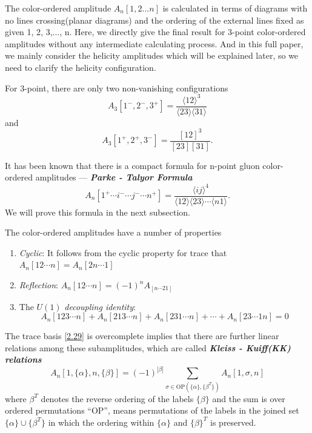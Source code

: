 \documentclass[12pt]{article}
\numberwithin{equation}{section}
\newcommand{\mdavg}[2]{\langle #1 \rangle\!\langle #2 \rangle}
\newcommand{\avg}[1]{\langle #1 \rangle}
\begin{document}
The color-ordered amplitude $A_n[1,2 ... n]$ is calculated in terms of diagrams with no lines crossing(planar diagrams) and the ordering of the external lines fixed as given 1, 2, 3,..., n. Here, we directly give the final result for 3-point color-ordered amplitudes without any intermediate calculating process. And in this full paper, we mainly consider the helicity amplitudes which will be explained later, so we need to clarify the helicity configuration.

For 3-point, there are only two non-vanishing configurations
\begin{equation}
    A_3[1^-,2^-,3^+]=\frac{\avg{12}^3}{\mdavg{23}{31}}
\end{equation}
and 
\begin{equation}
    A_3[1^+,2^+,3^-]=\frac{[12]^3}{[23][31]}.
\end{equation}

It has been known that there is a compact formula for n-point gluon color-ordered amplitudes --- \textbf{\textit{Parke - Talyor Formula}}
\begin{equation}
    A_n[1^+\cdots i^-\cdots j^- \cdots n^+]=\frac{\avg{ij}^4}{\mdavg{12}{23}\cdots\avg{n1}}.
\end{equation}
We will prove this formula in the next subsection.

The color-ordered amplitudes have a number of properties
\begin{enumerate}
    \item \textit{Cyclic}: It follows from the cyclic property for trace that $A_n[12\cdots n]=A_n[2n\cdots 1]$
    \item \textit{Reflection}: $A_n[12\cdots n]=(-1)^nA_[n\cdots 21]$
    \item The $U(1)$ \textit{decoupling identity}: 
    \begin{equation}
        A_n[123\cdots n]+A_n[213\cdots n]+A_n[231\cdots n]+\cdots + A_n[23\cdots 1n]=0
    \end{equation}
\end{enumerate}

The trace basis \eqref{2.29} is overcomplete implies that there are further linear relations among these subamplitudes, which are called 
\textit{\textbf{Kleiss - Kuiff(KK) relations}} 
\begin{equation}
    A_n[1,\{\alpha\},n,\{\beta\}]=(-1)^{|\beta|}\sum_{\sigma\in \text{OP}(\{\alpha\},\{\beta^T\}) }A_n[1,\sigma,n]
\end{equation}
where $\beta^T$ denotes the reverse ordering of the labels $\{\beta\}$  and the sum is over ordered
permutations “OP”, means permutations of the labels in the joined set $\{\alpha\}\cup \{\beta^T\}$ in which 
the ordering within $\{\alpha\}$ and $\{\beta\}^T$ is preserved. 
\end{document}

